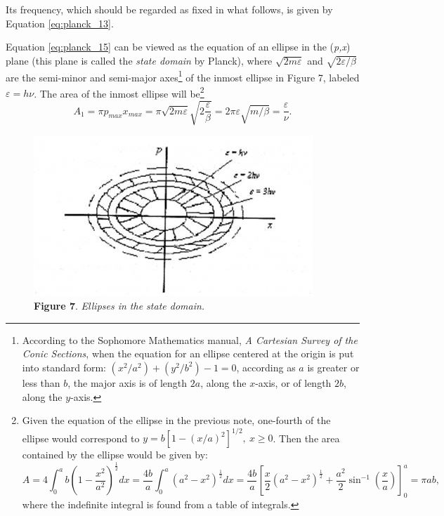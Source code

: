 Its frequency, which should be regarded as fixed in what follows, is
given by Equation \eqref{eq:planck_13}.

Equation \eqref{eq:planck_15} can be viewed as the equation of an ellipse in the
(\emph{p,x}) plane (this plane is called the \emph{state domain} by
Planck), where $\sqrt{2m\varepsilon}$ and $\sqrt{2\varepsilon/\beta}$ are the semi-minor and
semi-major axes\footnote{According to the Sophomore Mathematics manual,
  \emph{A Cartesian Survey of the Conic Sections}, when the equation for
  an ellipse centered at the origin is put into standard form:
  $(x^2/a^2) + (y^2/b^2) - 1 = 0$, according as
  $a$ is greater or less than $b$, the major axis is of
  length $2a$, along the $x$-axis, or of length $2b$,
  along the $y$-axis.} of the inmost ellipse in Figure 7, labeled
  $\varepsilon = h\nu$. The area of the inmost ellipse will be\footnote{Given
  the equation of the ellipse in the previous note, one-fourth of the
  ellipse would correspond to $y = b[1 - (x/a)^2]^{1/2},\ x \geq 0$.
Then the area contained by the ellipse would be given by:
\[A = 4\int_{0}^{a}b\left(1 - \frac{x^2}{a^2}\right)^{\frac{1}{2}}dx
= \frac{4b}{a}\int_{0}^{a}\left(a^2 - x^2\right)^{\frac{1}{2}}dx 
= \frac{4b}{a}\left[\frac{x}{2}\left(a^2 - x^2\right)^{\frac{1}{2}} 
+ \frac{a^2}{2}\sin^{- 1}\left(\frac{x}{a}\right)\right]_0^a = \pi ab,\]  where the indefinite integral is found from a table of integrals.}
%
\begin{equation}
A_1 = \pi p_{max}x_{max} = \pi\sqrt{2m\varepsilon}\sqrt{2\frac{\varepsilon}{\beta}} = 2\pi\varepsilon\sqrt{m/\beta} = \frac{\varepsilon}{\nu}. %
\end{equation}
%
\begin{figure}[h]
  \begin{center}
  \includegraphics[width=4.13542in,height=2.38542in]{images/05_planck/image050.jpg}
  \caption*{\textbf{Figure 7}. \emph{Ellipses in the state domain.}}
  \end{center}
\end{figure}
